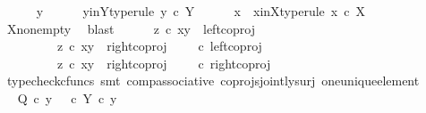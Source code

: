 \begin{isabellebody}
\ \ \ \ \isamarkupfalse%
\ y\isanewline
\ \ \ \ \isamarkupfalse%
\ y{\isacharunderscore}{\kern0pt}in{\isacharunderscore}{\kern0pt}Y{\isacharbrackleft}{\kern0pt}type{\isacharunderscore}{\kern0pt}rule{\isacharbrackright}{\kern0pt}{\isacharcolon}{\kern0pt}\ {\isachardoublequoteopen}y\ {\isasymin}\isactrlsub c\ Y{\isachardoublequoteclose}\isanewline
\ \ \ \ \isamarkupfalse%
\ x\ \ x{\isacharunderscore}{\kern0pt}in{\isacharunderscore}{\kern0pt}X{\isacharbrackleft}{\kern0pt}type{\isacharunderscore}{\kern0pt}rule{\isacharbrackright}{\kern0pt}{\isacharcolon}{\kern0pt}\ {\isachardoublequoteopen}x\ {\isasymin}\isactrlsub c\ X{\isachardoublequoteclose}\isanewline
\ \ \ \ \ \ \isamarkupfalse%
\ X{\isacharunderscore}{\kern0pt}nonempty\ \isamarkupfalse%
\ blast\isanewline
\isanewline
\ \ \ \ \isamarkupfalse%
\ {\isachardoublequoteopen}z\ {\isasymcirc}\isactrlsub c\ {\isasymlangle}x{\isacharcomma}{\kern0pt}y{\isasymrangle}\ {\isacharequal}{\kern0pt}\ left{\isacharunderscore}{\kern0pt}coproj\ {\isasymone}\ {\isacharparenleft}{\kern0pt}{\isasymone}\ {\isasymCoprod}\ {\isasymone}{\isacharparenright}{\kern0pt}\isanewline
\ \ \ \ \ \ \ \ {\isasymor}\ z\ {\isasymcirc}\isactrlsub c\ {\isasymlangle}x{\isacharcomma}{\kern0pt}y{\isasymrangle}\ {\isacharequal}{\kern0pt}\ right{\isacharunderscore}{\kern0pt}coproj\ {\isasymone}\ {\isacharparenleft}{\kern0pt}{\isasymone}\ {\isasymCoprod}\ {\isasymone}{\isacharparenright}{\kern0pt}\ {\isasymcirc}\isactrlsub c\ left{\isacharunderscore}{\kern0pt}coproj\ {\isasymone}\ {\isasymone}\isanewline
\ \ \ \ \ \ \ \ {\isasymor}\ z\ {\isasymcirc}\isactrlsub c\ {\isasymlangle}x{\isacharcomma}{\kern0pt}y{\isasymrangle}\ {\isacharequal}{\kern0pt}\ right{\isacharunderscore}{\kern0pt}coproj\ {\isasymone}\ {\isacharparenleft}{\kern0pt}{\isasymone}\ {\isasymCoprod}\ {\isasymone}{\isacharparenright}{\kern0pt}\ {\isasymcirc}\isactrlsub c\ right{\isacharunderscore}{\kern0pt}coproj\ {\isasymone}\ {\isasymone}{\isachardoublequoteclose}\isanewline
\ \ \ \ \ \ \isamarkupfalse%
\ {\isacharparenleft}{\kern0pt}typecheck{\isacharunderscore}{\kern0pt}cfuncs{\isacharcomma}{\kern0pt}\ smt\ comp{\isacharunderscore}{\kern0pt}associative{}\ coprojs{\isacharunderscore}{\kern0pt}jointly{\isacharunderscore}{\kern0pt}surj\ one{\isacharunderscore}{\kern0pt}unique{\isacharunderscore}{\kern0pt}element{\isacharparenright}{\kern0pt}\isanewline
\ \ \ \ \isamarkupfalse%
\ \isamarkupfalse%
\ {\isachardoublequoteopen}Q\ {\isasymcirc}\isactrlsub c\ y\ {\isacharequal}{\kern0pt}\ {\isacharparenleft}{\kern0pt}{\isasymt}\ {\isasymcirc}\isactrlsub c\ {\isasymbeta}\isactrlbsub Y\isactrlesub {\isacharparenright}{\kern0pt}\ {\isasymcirc}\isactrlsub c\ y{\isachardoublequoteclose}\isanewline

\end{isabellebody}
